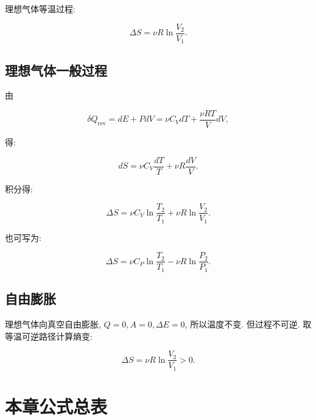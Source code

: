 \documentclass[
  a4paper,
]{ctexrep}
\begin{document}
理想气体等温过程:

\[
\Delta S=\nu R\ln\frac{V_2}{V_1}.
\]

\subsection{理想气体一般过程}\label{ux7406ux60f3ux6c14ux4f53ux4e00ux822cux8fc7ux7a0b}

由

\[
\delta Q_{\mathrm{rev}}=dE+PdV=\nu C_VdT+\frac{\nu RT}{V}dV,
\]

得:

\[
dS=\nu C_V\frac{dT}{T}+\nu R\frac{dV}{V}.
\]

积分得:

\[
\Delta S=\nu C_V\ln\frac{T_2}{T_1}+\nu R\ln\frac{V_2}{V_1}.
\]

也可写为:

\[
\Delta S=\nu C_P\ln\frac{T_2}{T_1}-\nu R\ln\frac{P_2}{P_1}.
\]

\subsection{自由膨胀}\label{ux81eaux7531ux81a8ux80c0}

理想气体向真空自由膨胀, \(Q=0,A=0,\Delta E=0\), 所以温度不变.
但过程不可逆. 取等温可逆路径计算熵变:

\[
\Delta S=\nu R\ln\frac{V_2}{V_1}>0.
\]

\section{本章公式总表}\label{ux672cux7ae0ux516cux5f0fux603bux8868-4}
\end{document}
